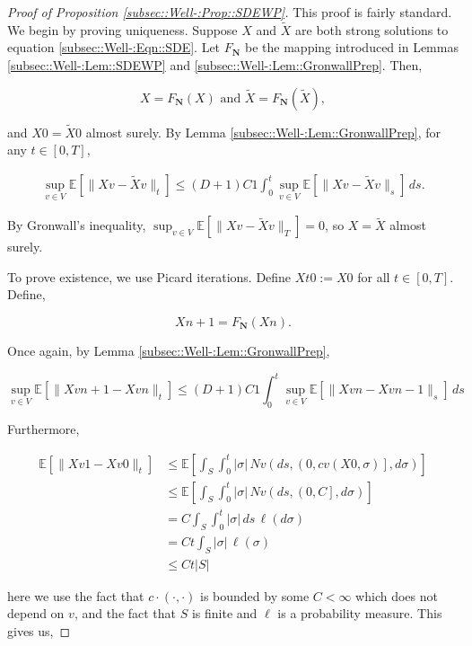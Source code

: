 \documentclass[12pt]{article}
\newcommand{\skipLine}{\vspace{12pt}}
\newcommand{\mb}{\mathbb}
\newcommand{\te}{\text}
\newcommand{\ex}[1]{\mb{E}\left[#1\right]}			%
\newcommand{\defeq}{:=}								%
\renewcommand{\v}{v}							%
\renewcommand{\S}{S}							%
\newcommand{\s}{\sigma}							%
\newcommand{\T}{T}								%
\renewcommand{\t}{t}							%
\renewcommand{\tt}{s}							%
\newcommand{\X}{X}								%
\newcommand{\IGr}{c}							%
\newcommand{\const}{C}							%
\newcommand{\degr}{D}							%
\newcommand{\poisses}{\mathbf{N}}				%
\newcommand{\poiss}{N}							%
\newcommand{\Sm}{\ell}							%
\newcommand{\Fpo}{F_{\poisses}}					%
\newcommand{\alt}[1]{\widetilde{#1}}			%
\begin{document}
\begin{proof}[Proof of Proposition \ref{subsec::Well-:Prop::SDEWP}]

This proof is fairly standard. We begin by proving uniqueness. Suppose \(\X{}{}\) and \(\alt{\X}{{}{}}\) are both strong solutions to equation \ref{subsec::Well-:Eqn::SDE}. Let \(\Fpo\) be the mapping introduced in Lemmas \ref{subsec::Well-:Lem::SDEWP} and \ref{subsec::Well-:Lem::GronwallPrep}. Then,

\[\X{}{} = \Fpo(\X{}{})\te{ and } \alt{\X}{{}{}} = \Fpo(\alt{\X}{{}{}}),\]

and \(\X{}{0} = \alt{\X}{{}{0}}\) almost surely. By Lemma \ref{subsec::Well-:Lem::GronwallPrep}, for any \(\t\in [0,\T]\),

\begin{align*}
\sup_{\v\in  V}\ex{\|\X{\v}{} - \alt{\X}{{\v}{}}\|_\t} \leq (\degr+1)\const{1}\int_0^\t\sup_{\v\in  V} \ex{\|\X{\v}{} - \alt{\X}{{\v}{}}\|_\tt}\,d\tt.
\end{align*}

By Gronwall's inequality, \(\sup_{\v \in  V} \ex{\|\X{\v}{} - \alt{\X}{{\v}{}}\|_\T} = 0\), so \(\X{}{} = \alt{\X}{{}{}}\) almost surely.

\skipLine

To prove existence, we use Picard iterations. Define \(\X{}{\t}{0} \defeq \X{}{0}\) for all \(\t \in [0,\T]\). Define,

\[\X{}{}{n+1} = \Fpo(\X{}{}{n}).\]

Once again, by Lemma \ref{subsec::Well-:Lem::GronwallPrep},

\[\sup_{\v \in  V} \ex{\|\X{\v}{}{n+1} - \X{\v}{}{n}\|_\t} \leq (\degr+1)\const{1} \int_0^\t \sup_{\v \in  V} \ex{\|\X{\v}{}{n} - \X{\v}{}{n-1}\|_\tt}\,d\tt\] 

Furthermore, 

\begin{align*}
\ex{\|\X{\v}{}{1} - \X{\v}{}{0}\|_\t} &\leq \ex{\int_\S\int_0^\t |\s|\,\poiss{\v}\left(d\tt,\left(0,\IGr{\v}(\X{}{0},\s)\right],d\s\right)}\\
&\leq \ex{\int_\S\int_0^\t |\s|\,\poiss{\v}\left(d\tt,\left(0,\const{}\right],d\s\right)}\\
&= \const{}\int_\S\int_0^\t |\s|\,d\tt\,\Sm(d\s)\\
&=\const{}\t\int_\S |\s|\,\Sm(\s)\\
&\leq \const{}\t|\S|
\end{align*}

here we use the fact that \(\IGr{\cdot}(\cdot,\cdot)\) is bounded by some \(\const{} < \infty\) which does not depend on \(\v\), and the fact that \(\S\) is finite and \(\Sm\) is a probability measure. This gives us,


\end{proof}
\end{document}
